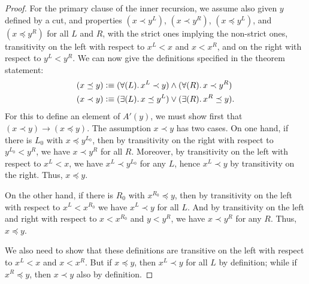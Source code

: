 \begin{proof}
  For the primary clause of the inner recursion, we assume also given $y$ defined by a cut, and properties $(x\prec y^L)$, $(x\prec y^R)$, $(x\preceq y^L)$, and $(x\preceq y^R)$ for all $L$ and $R$, with the strict ones implying the non-strict ones, transitivity on the left with respect to $x^L<x$ and $x<x^R$, and on the right with respect to $y^L<y^R$.
  We can now give the definitions specified in the theorem statement:
  \begin{align}
    (x\preceq y) &\defeq
    (\fall{L} x^L\prec y) \land (\fall{R} x\prec y^R)\label{eq:NO-preceq-def}\\
    (x\prec y) &\defeq
    (\exis{L} x\preceq y^L) \lor (\exis{R} x^R \preceq y).\label{eq:NO-prec-def}
  \end{align}
  For this to define an element of $A'(y)$, we must show first that $(x\prec y) \to (x\preceq y)$.
  The assumption $x\prec y$ has two cases.
  On one hand, if there is $L_0$ with $x\preceq y^{L_0}$, then by transitivity on the right with respect to $y^{L_0}<y^R$, we have $x\prec y^R$ for all $R$.
  Moreover, by transitivity on the left with respect to $x^L<x$, we have $x^L \prec y^{L_0}$ for any $L$, hence $x^L\prec y$ by transitivity on the right.
  Thus, $x\preceq y$.

  On the other hand, if there is $R_0$ with $x^{R_0}\preceq y$, then by transitivity on the left with respect to $x^L<x^{R_0}$ we have $x^L \prec y$ for all $L$.
  And by transitivity on the left and right with respect to $x<x^{R_0}$ and $y<y^R$, we have $x\prec y^R$ for any $R$.
  Thus, $x\preceq y$.

  We also need to show that these definitions are transitive on the left with respect to $x^L<x$ and $x<x^R$.
  But if $x\preceq y$, then $x^L\prec y$ for all $L$ by definition; while if $x^R\preceq y$, then $x\prec y$ also by definition.


\end{proof}
